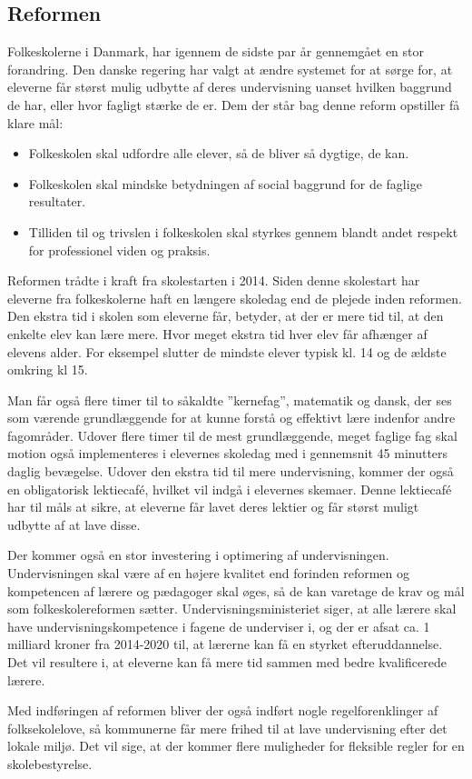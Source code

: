 \subsection{Reformen}
\label{Reformen}
Folkeskolerne i Danmark, har igennem de sidste par år gennemgået en stor forandring. Den danske regering har valgt at ændre systemet for at sørge for, at eleverne får størst mulig udbytte af deres undervisning uanset hvilken baggrund de har, eller hvor fagligt stærke de er.
Dem der står bag denne reform opstiller få klare mål\cite{reformenMaal}:
	\begin{itemize}
		\item Folkeskolen skal udfordre alle elever, så de bliver så dygtige, de kan.
		\item Folkeskolen skal mindske betydningen af social baggrund for de faglige resultater.
		\item Tilliden til og trivslen i folkeskolen skal styrkes gennem blandt andet respekt for professionel viden og praksis.
	\end{itemize}

Reformen trådte i kraft fra skolestarten i 2014. Siden denne skolestart har eleverne fra folkeskolerne haft en længere skoledag end de plejede inden reformen. Den ekstra tid i skolen som eleverne får, betyder, at der er mere tid til, at den enkelte elev kan lære mere. Hvor meget ekstra tid hver elev får afhænger af elevens alder. For eksempel slutter de mindste elever typisk kl. 14 og de ældste omkring kl 15.

Man får også flere timer til to såkaldte ”kernefag”, matematik og dansk, der ses som værende grundlæggende for at kunne forstå og effektivt lære indenfor andre fagområder. Udover flere timer til de mest grundlæggende, meget faglige fag skal motion også implementeres i elevernes skoledag med i gennemsnit 45 minutters daglig bevægelse\cite{reformenBorger}. Udover den ekstra tid til mere undervisning, kommer der også en obligatorisk lektiecafé, hvilket vil indgå i elevernes skemaer. Denne lektiecafé har til måls at sikre, at eleverne får lavet deres lektier og får størst muligt udbytte af at lave disse.

Der kommer også en stor investering i optimering af undervisningen. Undervisningen skal være af en højere kvalitet end forinden reformen og kompetencen af lærere og pædagoger skal øges, så de kan varetage de krav og mål som folkeskolereformen sætter. Undervisningsministeriet siger, at alle lærere skal have undervisningskompetence i fagene de underviser i, og der er afsat ca. 1 milliard kroner fra 2014-2020 til, at lærerne kan få en styrket efteruddannelse. Det vil resultere i, at eleverne kan få mere tid sammen med bedre kvalificerede lærere.

Med indføringen af reformen bliver der også indført nogle regelforenklinger af folksekolelove, så kommunerne får mere frihed til at lave undervisning efter det lokale miljø. Det vil sige, at der kommer flere muligheder for fleksible regler for en skolebestyrelse.
